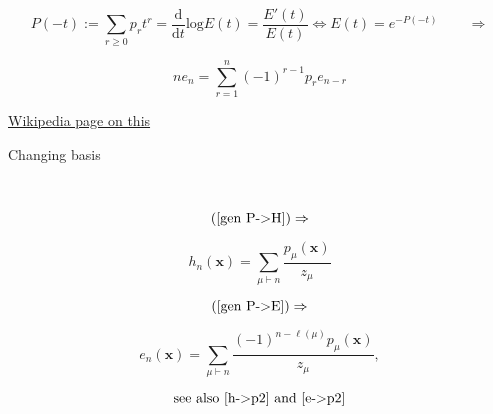 \documentclass[12pt]{amsart}
\begin{document}
\begin{mdframed}[linecolor=red!20, linewidth=3pt, innertopmargin=8pt]
	\begin{minipage}[t]{13cm}
		\begin{equation}\label{gen P->E}P(-t):=\sum_{r\geq 0}p_rt^r=\frac{\textrm{d}}{\textrm{d}t}\textrm{log}E(t)=\frac{E'(t)}{E(t)}		\Leftrightarrow E(t)=e^{-P(-t)} \hspace{25pt}\Rightarrow
		\end{equation}
	\end{minipage}
	\begin{minipage}[t]{6cm}
		\vspace{-3pt}\begin{equation} ne_n=\sum_{r=1}^n (-1)^{r-1}p_re_{n-r}
		\end{equation}
	\end{minipage}
	 \hyperref[gen]{Wikipedia page on this}
\end{mdframed}

\vspace{-10pt}\begin{mdframed}[linecolor=cyan!20, linewidth=3pt,innertopmargin=8pt]
	\begin{bf}Changing basis\end{bf}\label{h->p et e->p}
	\vspace{-15pt}\\
	\begin{minipage}[t]{1.5cm}
		\vspace{4pt}\begin{equation*}
			(\ref{gen P->H})\Rightarrow
		 \end{equation*}
	 \end{minipage}
	\begin{minipage}[t]{5cm}
		\begin{equation}\label{h->p}
			 h_n(\bm{x})=\sum_{\mu\vdash n} \frac{p_\mu(\bm{x})}{z_\mu}
		 \end{equation}
	 \end{minipage}
	 \begin{minipage}[t]{1.5cm}
		\vspace{4pt}\begin{equation*}
			(\ref{gen P->E})\Rightarrow
		 \end{equation*}
	 \end{minipage}
	\begin{minipage}[t]{7cm}
		\vspace{-2pt} \begin{equation}\label{e->p}
			  e_n(\bm{x})=\sum_{\mu\vdash n} \frac{(-1)^{n-\ell(\mu)}p_\mu(\bm{x})}{z_\mu},
		\end{equation}
	\end{minipage}
	\begin{minipage}[t]{2cm}
		\vspace{2pt} \begin{equation*}\text{see also \ref{h->p2} and \ref{e->p2}}
		\end{equation*}
	\end{minipage}
\end{mdframed}
\end{document}
